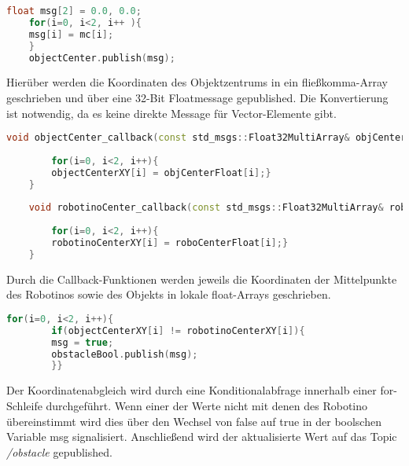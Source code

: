 	 
	\begin{lstlisting}[language = C++]
	float msg[2] = 0.0, 0.0;
	for(i=0, i<2, i++ ){
	msg[i] = mc[i];
	}
	objectCenter.publish(msg);
	\end{lstlisting}
	Hierüber werden die Koordinaten des Objektzentrums in ein fließkomma-Array geschrieben und über eine 32-Bit Floatmessage gepublished. Die Konvertierung ist notwendig, da es keine direkte Message für Vector-Elemente gibt.
	
	\begin{lstlisting}[language = C++]
	void objectCenter_callback(const std_msgs::Float32MultiArray& objCenterFloat){
	
		for(i=0, i<2, i++){
		objectCenterXY[i] = objCenterFloat[i];}
	}
	
	void robotinoCenter_callback(const std_msgs::Float32MultiArray& roboCenterFloat){
	
		for(i=0, i<2, i++){
		robotinoCenterXY[i] = roboCenterFloat[i];}
	}
	\end{lstlisting}
	Durch die Callback-Funktionen werden jeweils die Koordinaten der Mittelpunkte des Robotinos sowie des Objekts in lokale float-Arrays geschrieben.
	
	
	\begin{lstlisting}[language=C++]
		for(i=0, i<2, i++){
		if(objectCenterXY[i] != robotinoCenterXY[i]){
		msg = true;
	    obstacleBool.publish(msg);
		}}

	\end{lstlisting}
	Der Koordinatenabgleich wird durch eine Konditionalabfrage innerhalb einer for-Schleife durchgeführt. Wenn einer der Werte nicht mit denen des Robotino übereinstimmt wird dies über den Wechsel von false auf true in der boolschen Variable msg signalisiert. Anschließend wird der aktualisierte Wert auf das Topic \textit{/obstacle} gepublished.

	 